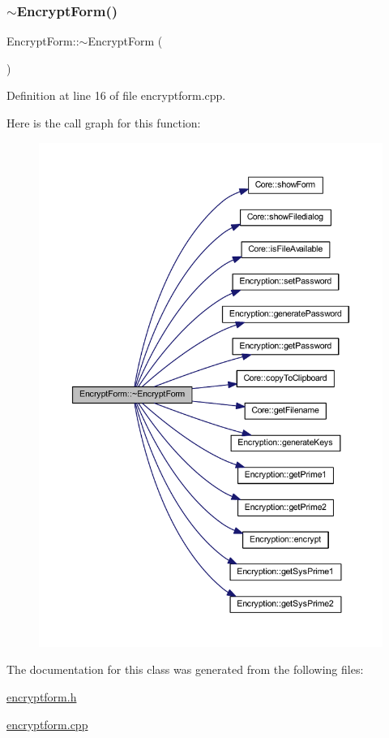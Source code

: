 \subsubsection{\texorpdfstring{$\sim$\+Encrypt\+Form()}{~EncryptForm()}}
{\footnotesize\ttfamily Encrypt\+Form\+::$\sim$\+Encrypt\+Form (\begin{DoxyParamCaption}{ }\end{DoxyParamCaption})}



Definition at line 16 of file encryptform.\+cpp.

Here is the call graph for this function\+:\nopagebreak
\begin{figure}[H]
\begin{center}
\leavevmode
\includegraphics[width=350pt]{class_encrypt_form_ae816abae02f20b132d5eee2033849342_cgraph}
\end{center}
\end{figure}


The documentation for this class was generated from the following files\+:\begin{DoxyCompactItemize}
\item 
\hyperlink{encryptform_8h}{encryptform.\+h}\item 
\hyperlink{encryptform_8cpp}{encryptform.\+cpp}\end{DoxyCompactItemize}
